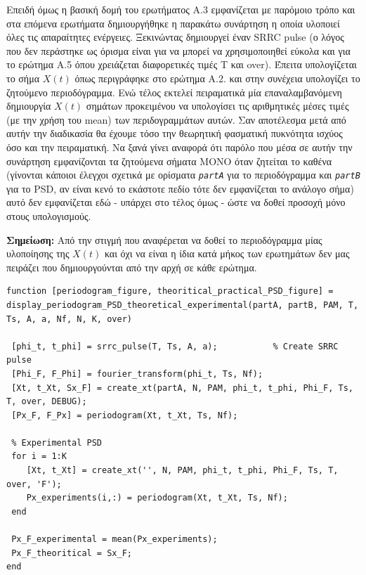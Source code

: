 \documentclass[11pt]{article}
\begin{document}
    \par \noindent
    Επειδή όμως η βασική δομή του ερωτήματος Α.3 εμφανίζεται με παρόμοιο τρόπο και στα επόμενα ερωτήματα δημιουργήθηκε η παρακάτω συνάρτηση η οποία υλοποιεί όλες τις απαραίτητες ενέργειες. 
    Ξεκινώντας δημιουργεί έναν SRRC pulse (ο λόγος που δεν περάστηκε ως όρισμα είναι για να μπορεί να χρησιμοποιηθεί εύκολα και για το ερώτημα Α.5 όπου χρειάζεται διαφορετικές τιμές Τ και over).
    Έπειτα υπολογίζεται το σήμα $X(t)$ όπως περιγράφηκε στο ερώτημα Α.2. και στην συνέχεια υπολογίζει το ζητούμενο περιοδόγραμμα. 
    Ενώ τέλος εκτελεί πειραματικά μία επαναλαμβανόμενη δημιουργία $X(t)$ σημάτων προκειμένου να υπολογίσει τις αριθμητικές μέσες τιμές (με την χρήση του mean) των περιδογραμμάτων αυτών. 
    Σαν αποτέλεσμα μετά από αυτήν την διαδικασία θα έχουμε τόσο την θεωρητική φασματική πυκνότητα ισχύος όσο και την πειραματική.  
    Να ξανά γίνει αναφορά ότι παρόλο που μέσα σε αυτήν την συνάρτηση εμφανίζονται τα ζητούμενα σήματα ΜΟΝΟ όταν ζητείται το καθένα (γίνονται κάποιοι έλεγχοι σχετικά με ορίσματα \emph{\texttt{partA}} για το περιοδόγραμμα και \emph{\texttt{partΒ}} για το PSD, αν είναι κενό το εκάστοτε πεδίο τότε δεν εμφανίζεται το ανάλογο σήμα) αυτό δεν εμφανίζεται εδώ - υπάρχει στο τέλος όμως - ώστε να δοθεί προσοχή μόνο στους υπολογισμούς.
    \par \noindent
    \textbf{Σημείωση:} Από την στιγμή που αναφέρεται να δοθεί το περιοδόγραμμα μίας υλοποίησης της $X(t)$ και όχι να είναι η ίδια κατά μήκος των ερωτημάτων δεν μας πειράζει που δημιουργούνται από την αρχή σε κάθε ερώτημα.
    
    
    \begin{lstlisting}[caption = {\texttt{display\_periodogram\_PSD\_theoretical\_experimental.m}}]
function [periodogram_figure, theoritical_practical_PSD_figure] = display_periodogram_PSD_theoretical_experimental(partA, partB, PAM, T, Ts, A, a, Nf, N, K, over)
    
 [phi_t, t_phi] = srrc_pulse(T, Ts, A, a);           % Create SRRC pulse  
 [Phi_F, F_Phi] = fourier_transform(phi_t, Ts, Nf);
 [Xt, t_Xt, Sx_F] = create_xt(partA, N, PAM, phi_t, t_phi, Phi_F, Ts, T, over, DEBUG);
 [Px_F, F_Px] = periodogram(Xt, t_Xt, Ts, Nf);
    
 % Experimental PSD 
 for i = 1:K                                            
    [Xt, t_Xt] = create_xt('', N, PAM, phi_t, t_phi, Phi_F, Ts, T, over, 'F');
    Px_experiments(i,:) = periodogram(Xt, t_Xt, Ts, Nf);
 end
    
 Px_F_experimental = mean(Px_experiments);           
 Px_F_theoritical = Sx_F;                        	
end
    \end{lstlisting}
    
\end{document}
